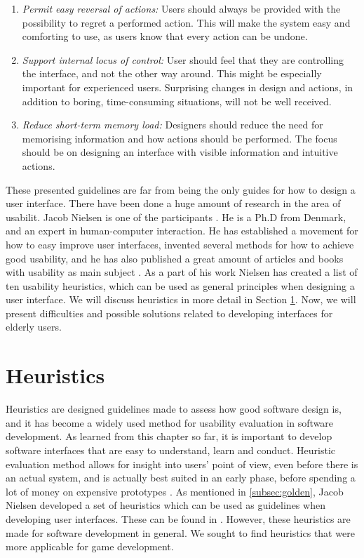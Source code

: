 \begin{enumerate}
\item \emph{Permit easy reversal of actions:} Users should always be provided with the possibility to regret a performed action. This will make the system easy and comforting to use, as users know that every action can be undone. 
\item \emph{Support internal locus of control:} User should feel that they are controlling the interface, and not the other way around. This might be especially important for experienced users. Surprising changes in design and actions, in addition to boring, time-consuming situations, will not be well received. 
\item \emph{Reduce short-term memory load:} Designers should reduce the need for memorising information and how actions should be performed. The focus should be on designing an interface with visible information and intuitive actions.
\end{enumerate}

These presented guidelines are far from being the only guides for how to design a user interface. There have been done a huge amount of research in the area of usabilit. Jacob Nielsen is one of the participants \cite{nielsen2005ten}. He is a Ph.D from Denmark, and an expert in human-computer interaction. He has established a movement for how to easy improve user interfaces, invented several methods for how to achieve good usability, and he has also published a great amount of articles and books with usability as main subject \cite{JNielsen}. As a part of his work Nielsen has created a list of ten usability heuristics, which can be used as general principles when designing a user interface\cite{nielsen2005ten}. We will discuss heuristics in more detail in Section \ref{sec:heur}. Now, we will present difficulties and possible solutions related to developing interfaces for elderly users.

\section{Heuristics}
\label{sec:heur}
Heuristics are designed guidelines made to assess how good software design is, and it has become a widely used method for usability evaluation in software development. As learned from this chapter so far, it is important to develop software interfaces that are easy to understand, learn and conduct. Heuristic evaluation method allows for insight into users' point of view, even before there is an actual system, and is actually best suited in an early phase, before spending a lot of money on expensive prototypes \cite{desurvire}. As mentioned in \ref{subsec:golden}, Jacob Nielsen developed a set of heuristics which can be used as guidelines when developing user interfaces. These can be found in \cite{nielsen2005ten}. However, these heuristics are made for software development in general. We sought to find heuristics that were more applicable for game development. 

